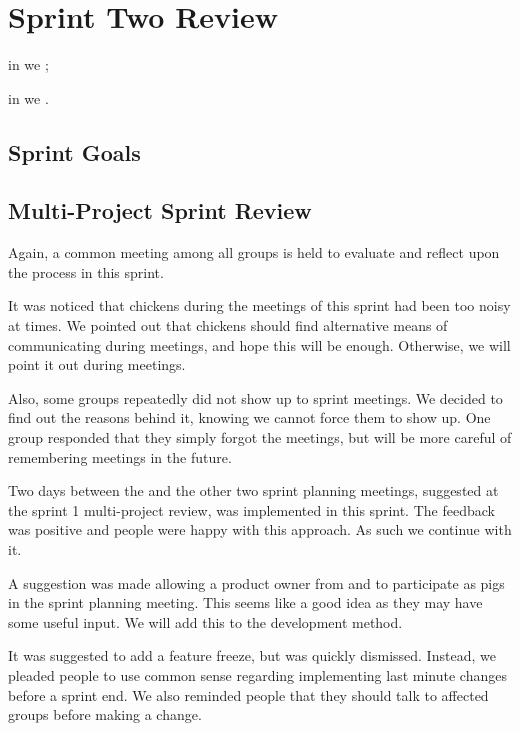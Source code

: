 \chapter{Sprint Two Review}\label{chap:sprint2_end}

\begin{chapterorganization}
  \item in  we ;
  \item in  we .
\end{chapterorganization}

\section{Sprint Goals}\label{sec:s2_goals}



\section{Multi-Project Sprint Review}\label{sec:s2_multiprj_review}
Again, a common meeting among all groups is held to evaluate and reflect upon the process in this sprint.

It was noticed that chickens during the meetings of this sprint had been too noisy at times. We pointed out that chickens should find alternative means of communicating during meetings, and hope this will be enough. Otherwise, we will point it out during meetings.

Also, some groups repeatedly did not show up to sprint meetings. We decided to find out the reasons behind it, knowing we cannot force them to show up. One group responded that they simply forgot the meetings, but will be more careful of remembering meetings in the future.

Two days between the \gui and the other two sprint planning meetings, suggested at the sprint 1 multi-project review, was implemented in this sprint. The feedback was positive and people were happy with this approach. As such we continue with it.

A suggestion was made allowing a product owner from \db and \bd to participate as pigs in the \gui sprint planning meeting. This seems like a good idea as they may have some useful input. We will add this to the development method.

It was suggested to add a feature freeze, but was quickly dismissed. Instead, we pleaded people to use common sense regarding implementing last minute changes before a sprint end. We also reminded people that they should talk to affected groups before making a change.